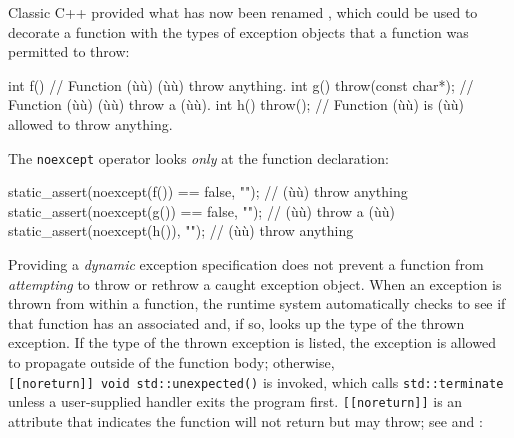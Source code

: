 Classic C++ provided what has now been renamed , which could be used to decorate a function with the
types of exception objects that a function was permitted to throw:

\begin{emcppslisting}
int f()                      // Function (ù{}ù) (ù{}ù) throw anything.
int g() throw(const char*);  // Function (ù{}ù) (ù{}ù) throw a (ù{}ù).
int h() throw();             // Function (ù{}ù) is (ù{}ù) allowed to throw anything.
\end{emcppslisting}
    

\noindent The \lstinline!noexcept! operator looks \emph{only} at the function
declaration:

\begin{emcppslisting}
static_assert(noexcept(f()) == false, "");  // (ù{}ù) throw anything
static_assert(noexcept(g()) == false, "");  // (ù{}ù) throw a (ù{}ù)
static_assert(noexcept(h()),  "");  // (ù{}ù) throw anything
\end{emcppslisting}
    

\noindent Providing a \emph{dynamic} exception specification does not prevent a
function from \emph{attempting} to throw or rethrow a caught exception
object. When an exception is thrown from within a function, the runtime
system automatically checks to see if that function has an associated
 and, if so, looks up the type
of the thrown exception. If the type of the thrown exception is listed,
the exception is allowed to propagate outside of the function body;
otherwise,
\lstinline![[noreturn]]!~\lstinline!void!~\lstinline!std::unexpected()! is
invoked, which calls \lstinline!std::terminate! unless a user-supplied
handler exits the program first. \lstinline![[noreturn]]! is an attribute
that indicates the function will not return but may throw; see
 and :

